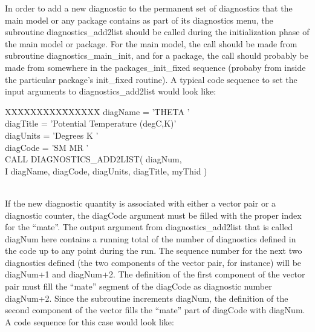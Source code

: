 \noindent
In order to add a new diagnostic to the permanent set of diagnostics that the
main model or any package contains as part of its diagnostics menu, the subroutine
diagnostics\_add2list should be called during the initialization phase of the
main model or package. For the main model, the call should be made from
subroutine diagnostics\_main\_init, and for a package, the call should probably
be made from somewhere in the packages\_init\_fixed sequence (probaby from inside
the particular package's init\_fixed routine). A typical code sequence to set the
input arguments to diagnostics\_add2list would look like:

\noindent
\begin{tabbing}
XXXXXXXXX\=XXXXXX\= \kill
\>      diagName  = 'THETA   ' \\
\>      diagTitle = 'Potential Temperature (degC,K)' \\
\>      diagUnits = 'Degrees K       ' \\
\>      diagCode  = 'SM      MR      ' \\
\>      CALL DIAGNOSTICS\_ADD2LIST( diagNum, \\
\>     I          diagName, diagCode, diagUnits, diagTitle, myThid ) \\
\\
\end{tabbing}

\noindent If the new diagnostic quantity is associated with either a vector
pair or a diagnostic counter, the diagCode argument must be filled with the
proper index for the ``mate''. The output argument from diagnostics\_add2list
that is called diagNum here contains a running total of the number of diagnostics
defined in the code up to any point during the run. The sequence number for the
next two diagnostics defined (the two components of the vector pair, for instance)
will be diagNum+1 and diagNum+2. The definition of the first component of the vector
pair must fill the ``mate'' segment of the diagCode as diagnostic number diagNum+2. 
Since the subroutine increments diagNum, the definition of the second component of 
the vector fills the ``mate'' part of diagCode with diagNum. A code sequence for 
this case would look like:

